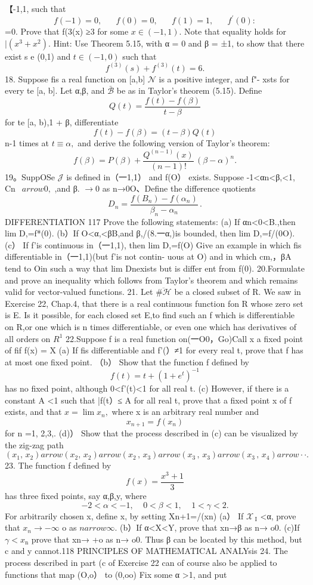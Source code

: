 【-1,1, such that $$ f(-1)=0,\;\;\;\;\;\;f(0)=0,\;\;\;\;\;\;f(1)=1,\;\;\;\;\;\;f^{\prime}(0): $$ =0. Prove that f(3(x) ≥3 for some $x\in(-1,1).$ Note that equality holds for $|(x^{3}+x^{2}).$ Hint: Use Theorem 5.15, with α = 0 and β = ±1, to show that there exist s e (0,1) and $t\in(-1,0)$ such that $$ f^{(3)}(s)+f^{(3)}(t)=6. $$ 18. Suppose fis a real function on [a,b] ${\mathcal{N}}$ is a positive integer, and f"- xsts for every te [a, b]. Let α,β, and ${\bar{\mathcal{B}}}$ be as in Taylor's theorem (5.15). Define $$ Q(t)={\frac{f(t)-f(\beta)}{t-\beta}} $$ for te [a, b),1 + β, differentiate $$ f(t)-f(\beta)=(t-\beta)Q(t) $$ n-1 times at $t\equiv\alpha,$ and derive the following version of Taylor's theorem: $$ f(\beta)=P(\beta)+{\frac{Q^{(n-1)}(x)}{(n-1)!}}\,(\beta-\alpha)^{n}. $$ 19。SuppOSe ${\mathcal{J}}$ is defined in（一1,1） and f(O） exists. Suppose -1<αn<β,<1, Cn $\ \: arrow0,$ ,and β. $\to0$ as n→0O、Define the difference quotients $$ D_{n}={\frac{f(B_{n})-f(\alpha_{n})}{\beta_{n}-\alpha_{n}}}\,. $$DIFFERENTIATION 117 Prove the following statements: (a) If αn<0<B.,then lim D,=f*(0). (b）If O<α,<βB,and {β,/(8.一α,)}is bounded, then lim D,=f/(0O). (c） If f’is continuous in（一1,1), then lim D,=f(O) Give an example in which fis differentiable in（一1,1)(but f'is not contin- uous at O) and in which cm,，βA tend to Oin such a way that lim Dnexists but is differ ent from f(0). 20.Formulate and prove an inequality which follows from Taylor's theorem and which remains valid for vector-valued functions. 21. Let $\overline{{\#\mathcal{H}}}$ be a closed subset of R. We saw in Exercise 22, Chap.4, that there is a real continuous function fon R whose zero set is E. Is it possible, for each closed set E,to find such an f which is differentiable on R,or one which is n times differentiable, or even one which has derivatives of all orders on $\textstyle{R^{1}}$ 22.Suppose f is a real function on(一O0，Go)Call x a fixed point of fif f(x) = X (a) If fis differentiable and f'(）≠1 for every real t, prove that f has at most one fixed point. （b） Show that the function f defined by $$ f(t)=t+(1+e^{t})^{-1} $$ has no fixed point, although 0<f'(t)<1 for all real t. (c) However, if there is a constant A <1 such that |f(t）≤ A for all real t, prove that a fixed point x of f exists, and that $x=\operatorname*{lim}x_{n},$ where x is an arbitrary real number and $$ x_{n+1}=f(x_{n}) $$ for n =1, 2,3,. (d)） Show that the process described in (c) can be visualized by the zig-zag path $$ (x_{1},\,x_{2}) arrow(x_{2},\,x_{2}) arrow(x_{2}\,,\,x_{3}) arrow(x_{3}\,,\,x_{3}) arrow(x_{3}\,,\,x_{4}) arrow\cdot\cdot. $$ 23. The function f defined by $$ f(x)={\frac{x^{3}+1}{3}} $$ has three fixed points, say α,β,y, where $$ -2<\alpha<-1,~~~~~0<\beta<1,~~~~~1<\gamma<2. $$ For arbitrarily chosen x, define {x,} by setting Xn+1=/(xn) (a） If $\mathcal{X}\,_{\mathrm{I}}$ <α, prove that $x_{n}\to-\infty$ o as $n arrow\infty.$ (b）If α<X<Y, prove that xn→β as n→ o0. (c)If $\gamma<x_{\mathrm{n}}$ prove that xn→ +o as n→ o0. Thus β can be located by this method, but c and y cannot.118 PRINCIPLES OF MATHEMATICAL ANALYsis 24. The process described in part (c of Exercise 22 can of course also be applied to functions that map (O,o） to (0,oo) Fix some α >1, and put $$ 